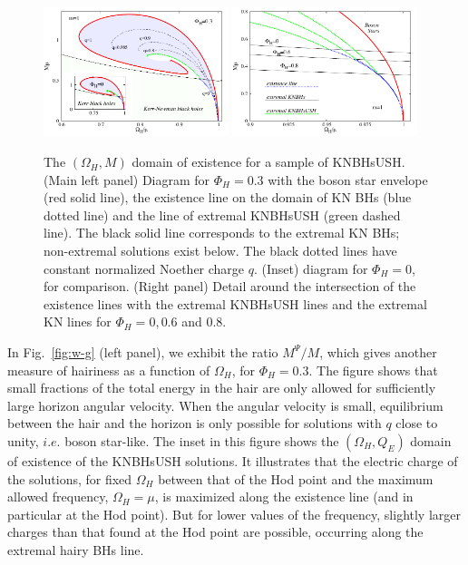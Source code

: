 \begin{figure}[h!]
  \begin{center}
    \includegraphics[width=0.48\textwidth]{papers/KerrNewman/BH-w-M} 
    \includegraphics[width=0.48\textwidth]{papers/KerrNewman/zoom-w-M}
  \end{center}
  \caption{The $(\Omega_H,M)$ domain of existence for a sample of KNBHsUSH. (Main left panel) Diagram for $\Phi_H=0.3$ with the boson star envelope (red solid line), the existence line on the domain of KN BHs (blue dotted line) and the line of extremal KNBHsUSH (green dashed line). The black solid line corresponds to the extremal KN BHs; non-extremal solutions exist below. The black dotted lines have constant normalized Noether charge $q$. (Inset) diagram for $\Phi_H=0$, for comparison. (Right panel) Detail around the intersection of the existence lines with the extremal KNBHsUSH lines and the extremal KN lines for $\Phi_H=0,0.6$ and $0.8$.  
	}
  \label{fig:w-M}
\end{figure}
 
  
 In Fig.~\ref{fig:w-g} (left panel), we exhibit the ratio $ M^{\Psi}/M$, which gives another measure of hairiness
   as a function of $\Omega_H$,
for $\Phi_H=0.3$. The figure shows that small fractions of the total energy in the hair are only allowed for sufficiently large horizon angular velocity. When the angular velocity is small, equilibrium between the hair and the horizon is only possible for solutions with $q$ close to unity, $i.e.$ boson star-like. 
The inset in this figure shows the $(\Omega_H,Q_E)$ domain of existence of the KNBHsUSH solutions. It illustrates that the electric charge of the solutions, for fixed $\Omega_H$ between that of the Hod point and the maximum allowed frequency, $\Omega_H=\mu$, is maximized along the existence line (and in particular at the Hod point). But for lower values of the frequency, slightly larger charges than that found at the Hod point are possible, occurring along the extremal hairy BHs line.

